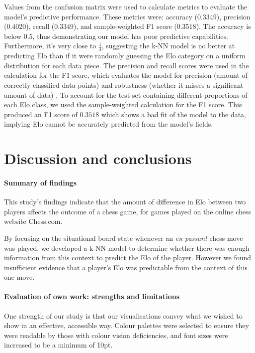 \documentclass[10pt,a4paper]{article}
\begin{document}
\begin{multicols}{2}
Values from the confusion matrix were used to calculate metrics to evaluate the model's predictive performance. These metrics were: accuracy ($0.3349$), precision ($0.4020$), recall ($0.3349$), and sample-weighted F1 score ($0.3518$). The accuracy is below $0.5$, thus demonstrating our model has poor predictive capabilities. Furthermore, it's very close to $\frac{1}{3}$, suggesting the k-NN model is no better at predicting Elo than if it were randomly guessing the Elo category on a uniform distribution for each data piece. The precision and recall scores were used in the calculation for the F1 score, which evaluates the model for precision (amount of correctly classified data points) and robustness (whether it misses a significant amount of data) \cite{MetricsToEvaluateYourML}. To account for the test set containing different proportions of each Elo class, we used the sample-weighted calculation for the F1 score. This produced an F1 score of $0.3518$ which shows a bad fit of the model to the data, implying Elo cannot be accurately predicted from the model's fields. \newline



\section{Discussion and conclusions}


\paragraph{Summary of findings}
This study's findings indicate that the amount of difference in Elo between two players affects the outcome of a chess game, for games played on the online chess website Chess.com.  \newline

By focusing on the situational board state whenever an \textit{en passant} chess move was played, we developed a k-NN model to determine whether there was enough information from this context to predict the Elo of the player. However we
found insufficient evidence that a player's Elo was predictable from the context of this one move.


\paragraph{Evaluation of own work: strengths and limitations}
One strength of our study is that our visualisations convey what we wished to show in an effective, accessible way. Colour palettes were selected to ensure they were readable by those with colour vision deficiencies, and font sizes were increased to be a minimum of 10pt.


\end{multicols}
\end{document}
